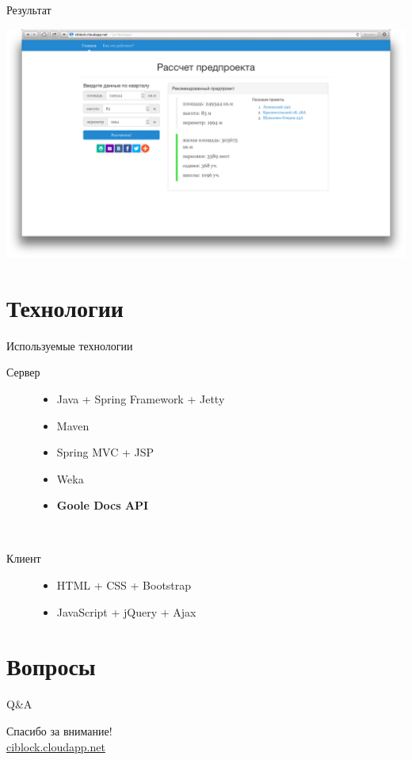 \documentclass[14pt, fleqn, xcolor={dvipsnames, table}]{beamer}
\begin{document}
        \begin{frame}{Результат}
            \begin{center}
                \includegraphics[scale=0.23]{example.png}
            \end{center}
        \end{frame}

    \section{Технологии}        
        
        \begin{frame}{Используемые технологии}
            \begin{description}
                \item [Сервер]
                    \begin{itemize}
                        \item Java + Spring Framework + Jetty
                        \item Maven
                        \item Spring MVC + JSP
                        \item Weka
                        \item \bf{Goole Docs API}
                    \end{itemize}
                ~\\
                \item [Клиент]
                    \begin{itemize}
                        \item HTML + CSS + Bootstrap
                        \item JavaScript + jQuery + Ajax
                    \end{itemize}
               
            \end{description}
        \end{frame}
        
    \section{Вопросы}
        
        \begin{frame}{Q\&A}
            \begin{center}
                Спасибо за внимание!\\
                \href{http://ciblock.cloudapp.net}{ciblock.cloudapp.net}
            \end{center}
        \end{frame}
\end{document}
